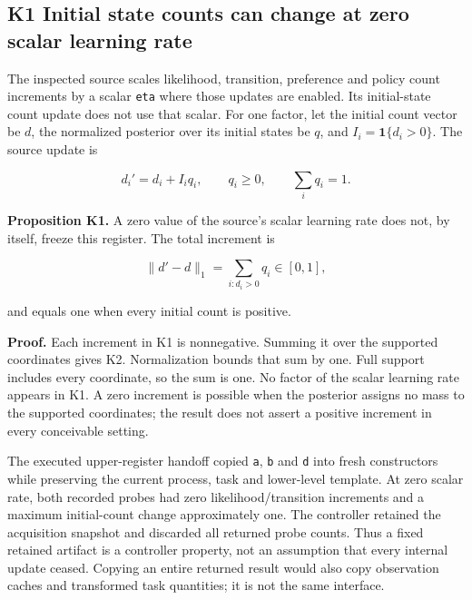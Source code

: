 \documentclass[
  american,
  11pt,
  letterpaper,
]{article}
\begin{document}
\subsection{K1 Initial state counts can change at zero scalar learning rate}\label{k1-initial-state-counts-can-change-at-zero-scalar-learning-rate}

The inspected source scales likelihood, transition, preference and policy count increments by a scalar \texttt{eta} where those updates are enabled. Its initial-state count update does not use that scalar. For one factor, let the initial count vector be \(d\), the normalized posterior over its initial states be \(q\), and \(I_i=\mathbf 1\{d_i>0\}\). The source update is

\begin{equation}
d_i'=d_i+I_iq_i,\qquad q_i\ge0,\qquad\sum_iq_i=1.
\tag{K1}
\end{equation}

\textbf{Proposition K1.} A zero value of the source's scalar learning rate does not, by itself, freeze this register. The total increment is

\begin{equation}
\lVert d'-d\rVert_1=\sum_{i:d_i>0}q_i\in[0,1],
\tag{K2}
\end{equation}

and equals one when every initial count is positive.

\textbf{Proof.} Each increment in K1 is nonnegative. Summing it over the supported coordinates gives K2. Normalization bounds that sum by one. Full support includes every coordinate, so the sum is one. No factor of the scalar learning rate appears in K1. A zero increment is possible when the posterior assigns no mass to the supported coordinates; the result does not assert a positive increment in every conceivable setting.

The executed upper-register handoff copied \texttt{a}, \texttt{b} and \texttt{d} into fresh constructors while preserving the current process, task and lower-level template. At zero scalar rate, both recorded probes had zero likelihood/transition increments and a maximum initial-count change approximately one. The controller retained the acquisition snapshot and discarded all returned probe counts. Thus a fixed retained artifact is a controller property, not an assumption that every internal update ceased. Copying an entire returned result would also copy observation caches and transformed task quantities; it is not the same interface.
\end{document}
